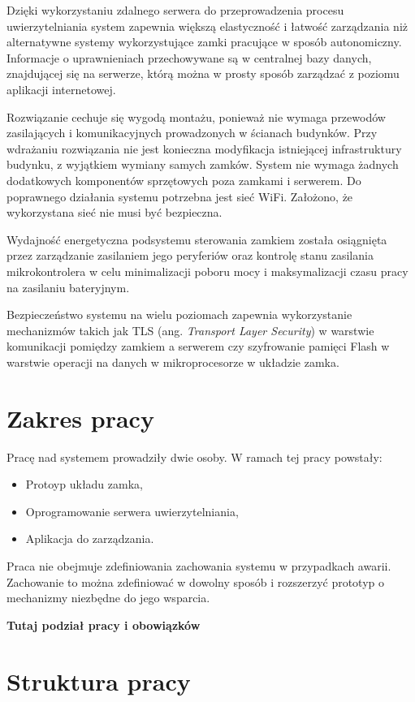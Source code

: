 	Dzięki wykorzystaniu zdalnego serwera do przeprowadzenia procesu uwierzytelniania system zapewnia większą elastyczność i łatwość zarządzania niż alternatywne systemy wykorzystujące zamki pracujące w sposób autonomiczny. Informacje o uprawnieniach przechowywane są w centralnej bazy danych, znajdującej się na serwerze, którą można w prosty sposób zarządzać z poziomu aplikacji internetowej.

	Rozwiązanie cechuje się wygodą montażu, ponieważ nie wymaga przewodów zasilających i komunikacyjnych prowadzonych w ścianach budynków. Przy wdrażaniu rozwiązania nie jest konieczna modyfikacja istniejącej infrastruktury budynku, z wyjątkiem wymiany samych zamków. System nie wymaga żadnych dodatkowych komponentów sprzętowych poza zamkami i serwerem. Do poprawnego działania systemu potrzebna jest sieć WiFi. Założono, że wykorzystana sieć nie musi być bezpieczna.

	Wydajność energetyczna podsystemu sterowania zamkiem została osiągnięta przez zarządzanie zasilaniem jego peryferiów oraz kontrolę stanu zasilania mikrokontrolera w celu minimalizacji poboru mocy i maksymalizacji czasu pracy na zasilaniu bateryjnym.

	Bezpieczeństwo systemu na wielu poziomach zapewnia wykorzystanie mechanizmów takich jak TLS (ang. \textit{Transport Layer Security}) w warstwie komunikacji pomiędzy zamkiem a serwerem czy szyfrowanie pamięci Flash w warstwie operacji na danych w mikroprocesorze w układzie zamka.

	\section{Zakres pracy}
	Pracę nad systemem prowadziły dwie osoby. W ramach tej pracy powstały:
	\begin{itemize}
	    \item Protoyp układu zamka,
	    \item Oprogramowanie serwera uwierzytelniania,
	    \item Aplikacja do zarządzania.
	\end{itemize}

	Praca nie obejmuje zdefiniowania zachowania systemu w przypadkach awarii. Zachowanie to można zdefiniować w dowolny sposób i rozszerzyć prototyp o mechanizmy niezbędne do jego wsparcia.

	\textbf{Tutaj podział pracy i obowiązków}

	\section{Struktura pracy}

